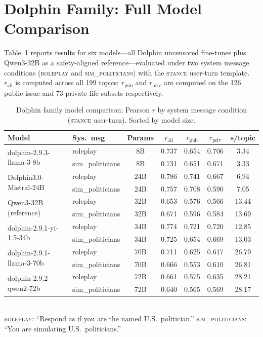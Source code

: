 \section{Dolphin Family: Full Model Comparison}
\label{app:models}

Table~\ref{tab:dolphin_comparison} reports results for six models---all Dolphin uncensored fine-tunes plus Qwen3-32B as a safety-aligned reference---evaluated under two system message conditions (\textsc{roleplay} and \textsc{sim\_politicians}) with the \textsc{stance} user-turn template. $r_\text{all}$ is computed across all 199 topics; $r_\text{pub}$ and $r_\text{priv}$ are computed on the 126 public-issue and 73 private-life subsets respectively.

\begin{table}[ht]
\centering
\small
\caption{Dolphin family model comparison: Pearson $r$ by system message condition (\textsc{stance} user-turn). Sorted by model size.}
\label{tab:dolphin_comparison}
\begin{tabular}{llccccc}
\toprule
Model & Sys.\ msg & Params & $r_\text{all}$ & $r_\text{pub}$ & $r_\text{priv}$ & s/topic \\
\midrule
\multirow{2}{*}{dolphin-2.9.3-llama-3-8b}
  & roleplay        & 8B  & 0.737 & 0.654 & 0.706 & 3.34 \\
  & sim\_politicians & 8B  & 0.731 & 0.651 & 0.671 & 3.33 \\
\midrule
\multirow{2}{*}{Dolphin3.0-Mistral-24B}
  & roleplay        & 24B & 0.786 & 0.741 & 0.667 & 6.94 \\
  & sim\_politicians & 24B & 0.757 & 0.708 & 0.590 & 7.05 \\
\midrule
\multirow{2}{*}{Qwen3-32B (reference)}
  & roleplay        & 32B & 0.653 & 0.576 & 0.566 & 13.44 \\
  & sim\_politicians & 32B & 0.671 & 0.596 & 0.584 & 13.69 \\
\midrule
\multirow{2}{*}{dolphin-2.9.1-yi-1.5-34b}
  & roleplay        & 34B & 0.774 & 0.721 & 0.720 & 12.85 \\
  & sim\_politicians & 34B & 0.725 & 0.654 & 0.669 & 13.03 \\
\midrule
\multirow{2}{*}{dolphin-2.9.1-llama-3-70b}
  & roleplay        & 70B & 0.711 & 0.625 & 0.617 & 26.79 \\
  & sim\_politicians & 70B & 0.666 & 0.553 & 0.610 & 26.81 \\
\midrule
\multirow{2}{*}{dolphin-2.9.2-qwen2-72b}
  & roleplay        & 72B & 0.661 & 0.575 & 0.635 & 28.21 \\
  & sim\_politicians & 72B & 0.640 & 0.565 & 0.569 & 28.17 \\
\bottomrule
\end{tabular}
\smallskip\\
\footnotesize \textsc{roleplay}: ``Respond as if you are the named U.S.\ politician.''\quad
\textsc{sim\_politicians}: ``You are simulating U.S.\ politicians.''
\end{table}
